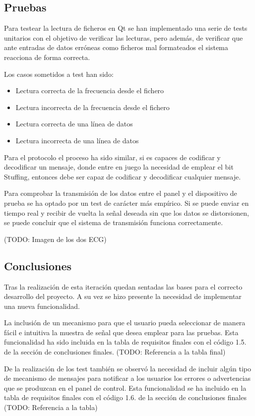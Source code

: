         \subsection{Pruebas}

        Para testear la lectura de ficheros en Qt se han implementado una serie de tests unitarios con el objetivo de verificar las lecturas, pero además, de verificar que ante entradas de datos erróneas como ficheros mal formateados el sistema reacciona de forma correcta.

        Los casos sometidos a test han sido:

        \begin{itemize}
                \item Lectura correcta de la frecuencia desde el fichero
                \item Lectura incorrecta de la frecuencia desde el fichero
                \item Lectura correcta de una línea de datos
                \item Lectura incorrecta de una línea de datos
        \end{itemize}

        Para el protocolo el proceso ha sido similar, si es capaces de codificar y decodificar un mensaje, donde entre en juego la necesidad de emplear el bit Stuffing, entonces debe ser capaz de codificar y decodificar cualquier mensaje.

        Para comprobar la transmisión de los datos entre el panel y el dispositivo de prueba se ha optado por un test de carácter más empírico. Si se puede enviar en tiempo real y recibir de vuelta la señal deseada sin que los datos se distorsionen, se puede concluir que el sistema de transmisión funciona correctamente.

        (TODO: Imagen de los dos ECG)


        \subsection{Conclusiones}

        Tras la realización de esta iteración quedan sentadas las bases para el correcto desarrollo del proyecto. A su vez se hizo presente la necesidad de implementar una nueva funcionalidad.

        La inclusión de un mecanismo para que el usuario pueda seleccionar de manera fácil e intuitiva la muestra de señal que desea emplear para las pruebas. Esta funcionalidad ha sido incluida en la tabla de requisitos finales con el código 1.5. de la sección de conclusiones finales. (TODO: Referencia a la tabla final)

        De la realización de los test también se observó la necesidad de incluir algún tipo de mecanismo de mensajes para notificar a los usuarios los errores o advertencias que se produzcan en el panel de control. Esta funcionalidad se ha incluido en la tabla de requisitos finales con el código 1.6. de la sección de conclusiones finales (TODO: Referencia a la tabla)
        